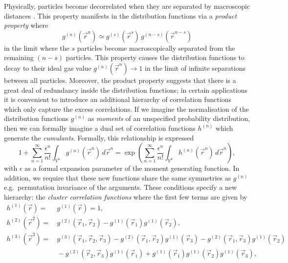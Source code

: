 Physically, particles become decorrelated when they are separated by macroscopic distances%
.
This property manifests in the distribution functions via a \emph{product property} where \cite{UhlenbeckJMP1963}
\begin{equation*}
  g^{(n)}(\vec{r}^n)
  \simeq
  g^{(s)}(\vec{r}^s) \, g^{(n-s)}(\vec{r}^{n-s})
\end{equation*}
in the limit where the $s$ particles become macroscopically separated from the remaining $(n-s)$ particles.
This property causes the distribution functions to decay to their ideal gas value $g^{(n)}(\vec{r}^n) \to 1$ in the limit of infinite separations between all particles.
Moreover, the product property suggests that there is a great deal of redundancy inside the distribution functions; in certain applications it is convenient to introduce an additional hierarchy of correlation functions which only capture the excess correlations.
If we imagine the normalisation of the distribution functions $g^{(n)}$ as \emph{moments} of an unspecified probability distribution, then we can formally imagine a dual set of correlation functions $h^{(n)}$ which generate the \emph{cumulants}.
Formally, this relationship is expressed \cite{Santos2016}
\begin{equation}\label{eq:correlation-moment-generating-function}
  1
  + \sum_{n=1}^\infty \frac{\epsilon^n}{n!}
  \int_{V^n} g^{(n)}(\vec{r}^n) \, d\vec{r}^n
  =
  \exp{
    \left(
    \sum_{n=1}^\infty \frac{\epsilon^n}{n!}
    \int_{V^n} h^{(n)}(\vec{r}^n) \, d\vec{r}^n
    \right)
  },
\end{equation}
with $\epsilon$ as a formal expansion parameter of the moment generating function.
In addition, we require that these new functions share the same symmetries as $g^{(n)}$ e.g.\ permutation invariance of the arguments.
These conditions specify a new hierarchy: the \emph{cluster correlation functions}%
where the first few terms are given by \cite{UhlenbeckJMP1963}
\begin{subequations}
  \begin{align}
    h^{(1)}(\vec{r})
    =& \,
    g^{(1)}(\vec{r}) = 1,
    \\
    h^{(2)}(\vec{r}^2)
    =& \,
    g^{(2)}(\vec{r}_1, \vec{r}_2)
    - g^{(1)}(\vec{r}_1) g^{(1)}(\vec{r}_2),
    \label{eq:pair-cluster-correlation-function}
    \\
    h^{(3)}(\vec{r}^3)
    =& \,
    g^{(3)}(\vec{r}_1, \vec{r}_2, \vec{r}_3)
    - g^{(2)}(\vec{r}_1, \vec{r}_2) g^{(1)}(\vec{r}_3)
    - g^{(2)}(\vec{r}_1, \vec{r}_3) g^{(1)}(\vec{r}_2)
    \nonumber \\ & \,
    - g^{(2)}(\vec{r}_2, \vec{r}_3) g^{(1)}(\vec{r}_1)
    + g^{(1)}(\vec{r}_1) g^{(1)}(\vec{r}_2) g^{(1)}(\vec{r}_3),
  \end{align}
\end{subequations}
